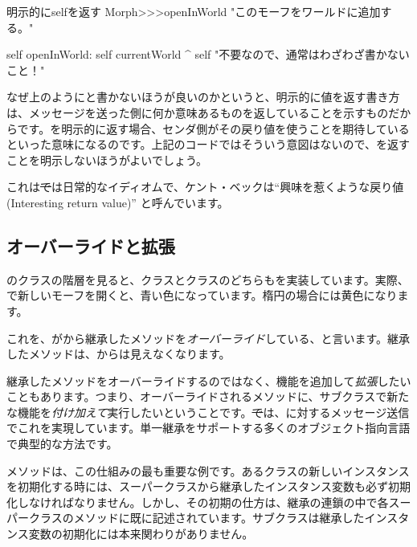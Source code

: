 \documentclass[a4paper,10pt,twoside]{book}
\begin{document}
\begin{method}[openInWorldReturnSelf]{明示的にselfを返す}
Morph>>>openInWorld
	"このモーフをワールドに追加する。"
	
    self openInWorld: self currentWorld
	^ self		"不要なので、通常はわざわざ書かないこと！"
\end{method}

なぜ上のようにと書かないほうが良いのかというと、明示的に値を返す書き方は、メッセージを送った側に何か意味あるものを返していることを示すものだからです。\self を明示的に返す場合、センダ側がその戻り値を使うことを期待しているといった意味になるのです。上記のコードではそういう意図はないので、\self を返すことを明示しないほうがよいでしょう。

これは\st では日常的なイディオムで、ケント・ベックは``興味を惹くような戻り値(Interesting return value)'' \cite{Beck97a} と呼んでいます。


\subsection{オーバーライドと拡張}

のクラスの階層を見ると、クラスと\mbox{}クラスのどちらもを実装しています。実際、で新しいモーフを開くと、青い色になっています。楕円の場合には黄色になります。

これを、がから継承したメソッドを\emph{オーバーライド}している、と言います。継承したメソッドは、からは見えなくなります。

継承したメソッドをオーバーライドするのではなく、機能を追加して\emph{拡張}したいこともあります。つまり、オーバーライドされるメソッドに、サブクラスで新たな機能を\emph{付け加えて}実行したいということです。\st では、\super に対するメッセージ送信でこれを実現しています。単一継承をサポートする多くのオブジェクト指向言語で典型的な方法です。

メソッドは、この仕組みの最も重要な例です。あるクラスの新しいインスタンスを初期化する時には、スーパークラスから継承したインスタンス変数も必ず初期化しなければなりません。しかし、その初期の仕方は、継承の連鎖の中で各スーパークラスのメソッドに既に記述されています。サブクラスは継承したインスタンス変数の初期化には本来関わりがありません。
\end{document}
